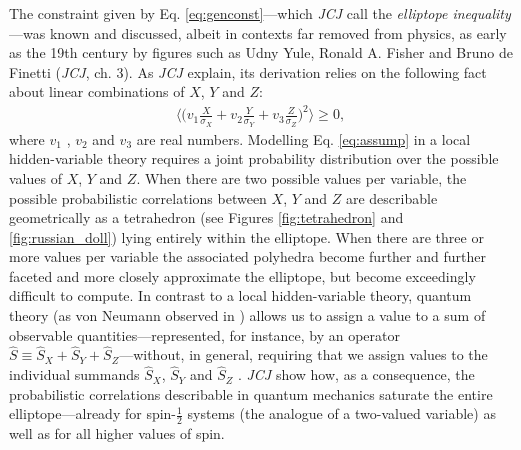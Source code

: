 \documentclass[12pt,english,twoside]{article}
\numberwithin{equation}{section}
\begin{document}
The constraint given by Eq. \eqref{eq:genconst}---which \emph{JCJ} call the \emph{elliptope inequality}---was known and discussed, albeit in contexts far removed from physics, as early as the 19th century by figures such as Udny Yule, Ronald A. Fisher and Bruno de Finetti (\emph{JCJ}, ch. 3). As \emph{JCJ} explain, its derivation relies on the following fact about linear combinations of $X$, $Y$ and $Z$:
\begin{align}
  \label{eq:assump}
  \Big\langle \Big( v_1 \frac{X}{\sigma_X} + v_2 \frac{Y}{\sigma_Y}
    + v_3 \frac{Z}{\sigma_Z} \Big)^{\!2} \Big\rangle \ge 0,
\end{align}
where $v_1$ , $v_2$  and $v_3$ are real numbers. Modelling Eq. \eqref{eq:assump} in a local hidden-variable theory requires a joint probability distribution over the possible values of $X$, $Y$ and $Z$. When there are two possible values per variable, the possible probabilistic correlations between $X$, $Y$ and $Z$ are describable geometrically as a tetrahedron (see Figures \ref{fig:tetrahedron} and \ref{fig:russian_doll}) lying entirely within the elliptope. When there are three or more values per variable the associated polyhedra become further and further faceted and more closely approximate the elliptope, but become exceedingly difficult to compute. In contrast to a local hidden-variable theory, quantum theory (as von Neumann observed in \citeyear{vonNeumann1927b}) allows us to assign a value to a sum of observable quantities---represented, for instance, by an operator $\hat{S} \equiv \hat{S}_X + \hat{S}_Y + \hat{S}_Z$---without, in general, requiring that we assign values to the individual summands $\hat{S}_X$, $\hat{S}_Y$ and $\hat{S}_Z$ \citep[cf.][p. 376]{stein1972}. \emph{JCJ} show how, as a consequence, the probabilistic correlations describable in quantum mechanics saturate the entire elliptope---already for spin-$\frac{1}{2}$ systems (the analogue of a two-valued variable) as well as for all higher values of spin.
\end{document}
